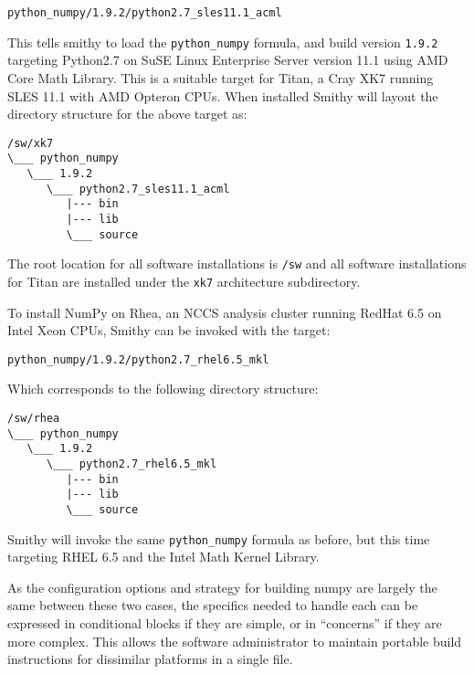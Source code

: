 \documentclass{acm_proc_article-sp}
\begin{document}
\begin{quoting}
\begin{verbatim}
python_numpy/1.9.2/python2.7_sles11.1_acml
\end{verbatim}
\end{quoting}

This tells smithy to load the \texttt{python\_numpy} formula, and build version
\texttt{1.9.2} targeting Python2.7 on SuSE Linux Enterprise Server version 11.1
using AMD Core Math Library. This is a suitable target for Titan, a Cray XK7
running SLES 11.1 with AMD Opteron CPUs. When installed Smithy will layout the
directory structure for the above target as:

\begin{quoting}
\begin{verbatim}
/sw/xk7
\___ python_numpy
   \___ 1.9.2
      \___ python2.7_sles11.1_acml
         |--- bin
         |--- lib
         \___ source
\end{verbatim}
\end{quoting}

The root location for all software installations is \texttt{/sw} and all
software installations for Titan are installed under the \texttt{xk7}
architecture subdirectory.

To install NumPy on Rhea, an NCCS analysis cluster running RedHat 6.5 on Intel
Xeon CPUs, Smithy can be invoked with the target:

\begin{quoting}
\begin{verbatim}
python_numpy/1.9.2/python2.7_rhel6.5_mkl
\end{verbatim}
\end{quoting}

Which corresponds to the following directory structure:

\begin{quoting}
\begin{verbatim}
/sw/rhea
\___ python_numpy
   \___ 1.9.2
      \___ python2.7_rhel6.5_mkl
         |--- bin
         |--- lib
         \___ source
\end{verbatim}
\end{quoting}

Smithy will invoke the same \texttt{python\_numpy} formula as before, but this
time targeting RHEL 6.5 and the Intel Math Kernel Library.

As the configuration options and strategy for building numpy are largely the
same between these two cases, the specifics needed to handle each can be
expressed in conditional blocks if they are simple, or in ``concerns'' if they
are more complex. This allows the software administrator to maintain portable
build instructions for dissimilar platforms in a single file.
\end{document}
